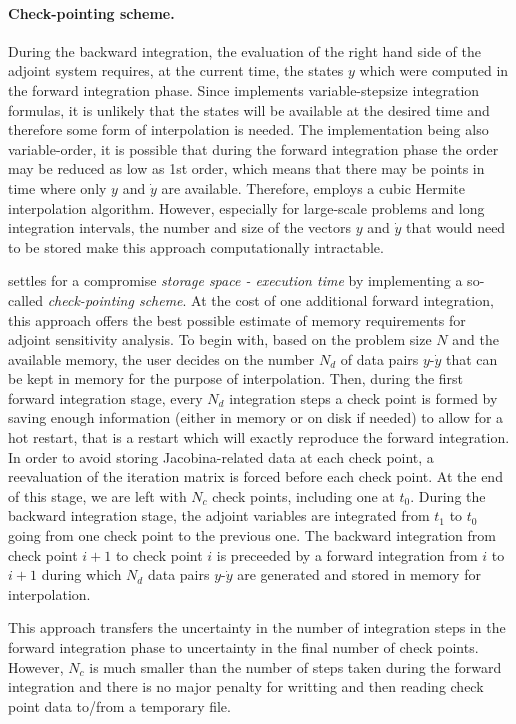 \paragraph{Check-pointing scheme.}
During the backward integration, the evaluation of the right hand side 
of the adjoint system requires, at the current time, the states $y$ which
were computed in the forward integration phase.
Since {\cvodes} implements variable-stepsize integration formulas,
it is unlikely that the states will be available at the desired time and
therefore some form of interpolation is needed. The {\cvodes} implementation
being also variable-order, it is possible that during the forward
integration phase the order may be reduced as low as 1st order,
which means that there may be points in time where only $y$ and ${\dot y}$
are available. Therefore, {\cvodes} employs a cubic Hermite interpolation
algorithm. However, especially for large-scale problems and long integration
intervals, the number and size of the vectors $y$ and ${\dot y}$ that would 
need to be stored make this approach computationally intractable. 

{\cvodes} settles for a compromise {\em storage space - execution time} by
implementing a so-called {\em check-pointing scheme}. At the cost of
one additional forward integration, this approach offers the best possible 
estimate of memory requirements for adjoint sensitivity analysis. To begin with,
based on the problem size $N$ and the available memory, the user decides on 
the number $N_d$ of data pairs $y$-${\dot y}$ that can be kept in memory for 
the purpose of interpolation. Then, during the first forward integration stage, 
every $N_d$ integration steps a check point is formed by saving enough information
(either in memory or on disk if needed) to allow for a hot restart, that is a restart
which will exactly reproduce the forward integration. In order to avoid storing
Jacobina-related data at each check point, a reevaluation of the iteration matrix
is forced before each check point. At the end of this stage, we are left with $N_c$ 
check points, including one at $t_0$.
During the backward integration stage, the adjoint variables are integrated
from $t_1$ to $t_0$ going from one check point to the previous one.
The backward integration from check point $i+1$ to check point $i$ is preceeded
by a forward integration from $i$ to $i+1$ during which $N_d$ data pairs 
$y$-${\dot y}$ are generated and stored in memory for interpolation.

This approach transfers the uncertainty in the number of integration
steps in the forward integration phase to uncertainty in the final number of check 
points. However, $N_c$ is much smaller than the number of steps taken during
the forward integration and there is no major penalty for writting and then reading
check point data to/from a temporary file.

